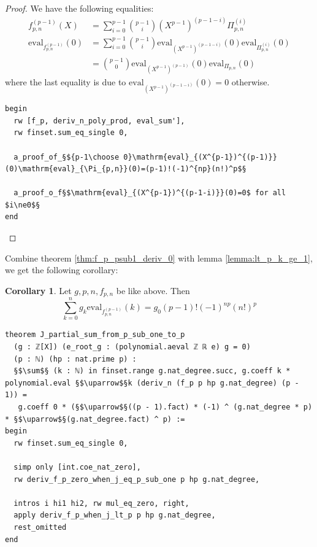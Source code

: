 \documentclass{report}
\theoremstyle{definition}
\newtheorem{corollary}{Corollary}[section]
\begin{document}
\begin{proof}
We have the following equalities:
\begin{equation*}
\begin{aligned}
f_{p,n}^{(p-1)}(X)&=\sum_{i=0}^{p-1}{p-1\choose i}(X^{p-1})^{(p-1-i)}\Pi_{p,n}^{(i)} \\
\mathrm{eval}_{f_{p,n}^{(p-1)}}(0)&=\sum_{i=0}^{p-1}{p-1\choose i}\mathrm{eval}_{(X^{p-1})^{(p-1-i)}}(0)\mathrm{eval}_{\Pi_{p,n}^{(i)}}(0)\\
&={p-1\choose 0}\mathrm{eval}_{(X^{p-1})^{(p-1)}}(0)\mathrm{eval}_{\Pi_{p,n}}(0)
\end{aligned}
\end{equation*}
where the last equality is due to $\mathrm{eval}_{(X^{p-1})^{(p-1-i)}}(0)=0$ otherwise.
\begin{verbatim}
begin
  rw [f_p, deriv_n_poly_prod, eval_sum'],
  rw finset.sum_eq_single 0,

  a_proof_of_§${p-1\choose 0}\mathrm{eval}_{(X^{p-1})^{(p-1)}}(0)\mathrm{eval}_{\Pi_{p,n}}(0)=(p-1)!(-1)^{np}(n!)^p$§

  a_proof_o_f§$\mathrm{eval}_{(X^{p-1})^{(p-1-i)}}(0)=0$ for all $i\ne0$§
end
\end{verbatim}
\end{proof}

Combine theorem \ref{thm:f_p_psub1_deriv_0} with lemma \ref{lemma:lt_p_k_ge_1}, we get the following corollary:
\begin{corollary}\label{cor:part2}
Let $g,p,n,f_{p,n}$ be like above. Then 
$$
\sum_{k=0}^n g_k \mathrm{eval}_{f_{p,n}^{(p-1)}}(k)=g_0 (p-1)! (-1)^{np} (n!)^p
$$

\begin{verbatim}
theorem J_partial_sum_from_p_sub_one_to_p
  (g : ℤ[X]) (e_root_g : (polynomial.aeval ℤ ℝ e) g = 0)
  (p : ℕ) (hp : nat.prime p) :
  §$\sum$§ (k : ℕ) in finset.range g.nat_degree.succ, g.coeff k * polynomial.eval §$\uparrow$§k (deriv_n (f_p p hp g.nat_degree) (p - 1)) = 
   g.coeff 0 * (§$\uparrow$§((p - 1).fact) * (-1) ^ (g.nat_degree * p) * §$\uparrow$§(g.nat_degree.fact) ^ p) :=
begin
  rw finset.sum_eq_single 0,

  simp only [int.coe_nat_zero],
  rw deriv_f_p_zero_when_j_eq_p_sub_one p hp g.nat_degree,

  intros i hi1 hi2, rw mul_eq_zero, right,
  apply deriv_f_p_when_j_lt_p p hp g.nat_degree,
  rest_omitted
end
\end{verbatim}
\end{corollary}
\end{document}
